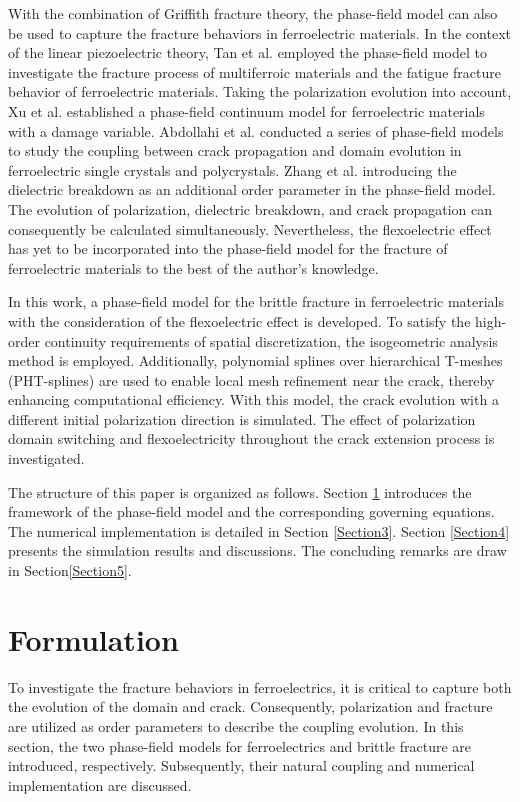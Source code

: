 \documentclass[times,fleqn,11pt]{elsarticle}
\begin{document}
With the combination of Griffith fracture theory, the phase-field model can also be used to capture the fracture behaviors in ferroelectric materials. In the context of the linear piezoelectric theory, Tan et al. \cite{tan_phase_2023,tan_phase_2022} employed the phase-field model to investigate the fracture process of multiferroic materials  and the fatigue fracture behavior of ferroelectric materials. Taking the polarization evolution into account, Xu et al. \cite{xu_fracture_2010} established a phase-field continuum model for ferroelectric materials with a damage variable. Abdollahi et al. \cite{abdollahi_phase-field_2011,abdollahi_phase-field_2011-1,abdollahi_phase-field_2012,abdollahi_three-dimensional_2014} conducted a series of phase-field models to study the coupling between crack propagation and domain evolution in ferroelectric single crystals and polycrystals. Zhang et al. \cite{yong_zhang_phase_2022,zhang_jumping_2022} introducing the dielectric breakdown as an additional order parameter in the phase-field model. The evolution of polarization, dielectric breakdown, and crack propagation can consequently be calculated simultaneously. Nevertheless, the flexoelectric effect has yet to be incorporated into the phase-field model for the fracture of ferroelectric materials to the best of the author's knowledge.

In this work, a phase-field model for the brittle fracture in ferroelectric materials with the consideration of the flexoelectric effect is developed. To satisfy the high-order continuity requirements of spatial discretization, the isogeometric analysis method is employed. Additionally, polynomial splines over hierarchical T-meshes (PHT-splines) are used to enable local mesh refinement near the crack, thereby enhancing computational efficiency. With this model, the crack evolution with a different initial polarization direction is simulated. The effect of polarization domain switching and flexoelectricity throughout the crack extension process is investigated. 

The structure of this paper is organized as follows. Section \ref{Section2} introduces the framework of the phase-field model and the corresponding governing equations. The numerical implementation is detailed in Section \ref{Section3}. Section \ref{Section4} presents the simulation results and discussions. The concluding remarks are draw in Section\ref{Section5}.

\section{Formulation}\label{Section2}
To investigate the fracture behaviors in ferroelectrics, it is critical to capture both the evolution of the domain and crack. Consequently, polarization and fracture are utilized as order parameters to describe the coupling evolution.  In this section, the two phase-field models for ferroelectrics and brittle fracture are introduced, respectively. Subsequently, their natural coupling and numerical implementation are discussed.
\end{document}
